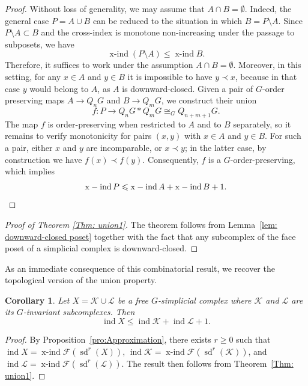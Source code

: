 \documentclass[preprint,12pt]{article}
\renewcommand{\le}{\leqslant}
\renewcommand{\ge}{\geqslant}
\newtheorem{corollary}[theorem]{Corollary}
\theoremstyle{definition}
\theoremstyle{remark}
\numberwithin{equation}{section}
\DeclareMathOperator{\ind}{ind}
\DeclareMathOperator{\xind}{x-ind}
\DeclareMathOperator{\sd}{sd}
\begin{document}
\begin{proof}
Without loss of generality, we may assume that $A\cap B=\emptyset$. Indeed, the general case $P=A\cup B$ can be reduced to the situation in which $B=P\setminus
A$. Since $P\setminus A\subset B$ and the cross-index is monotone non-increasing
under the passage to subposets, we have
\[
\xind(P\setminus A)\le \xind B.
\]
Therefore, it suffices to work under the assumption $A\cap B=\emptyset$. Moreover, in this setting, for any $x\in A$ and $y\in B$ it is impossible to have $y \prec x$, because in that case $y$
would belong to $A$, as $A$ is downward-closed. Given a pair of $G$-order preserving maps $A\to Q_nG$ and $B\to Q_mG$, we construct their union
\[
f:P\to Q_nG*Q_mG\cong_{G} Q_{n+m+1}G.
\]
The map $f$ is order-preserving when restricted to $A$ and to $B$ separately, so it
remains to verify monotonicity for pairs $(x,y)$ with $x\in A$ and $y\in B$. For such a pair, either $x$
and $y$ are incomparable, or $x \prec y$; in the latter case, by construction we have $f(x)\prec f(y)$. Consequently,
$f$ is a $G$-order-preserving, which implies
\[
\xind P\le \xind A+\xind B+1.\qedhere
\]
\end{proof}

\begin{proof}[Proof of Theorem \ref{Thm: union1}]
The theorem follows from Lemma~\ref{lem: downward-closed poset} together with the fact that any subcomplex of the face poset of a simplicial complex is downward-closed.
\end{proof}

As an immediate consequence of this combinatorial result, we recover the topological version of the union property.

\begin{corollary}{\cite{schw1966}}
Let $X = \mathcal{K} \cup \mathcal{L}$ be a free $G$-simplicial complex where $\mathcal{K}$ and $\mathcal{L}$ are its $G$-invariant subcomplexes. Then
\[
\ind X \le \ind \mathcal{K} + \ind \mathcal{L} + 1.
\]
\end{corollary}

\begin{proof}
By Proposition~\ref{pro:Approximation}, there exists $r \ge 0$ such that 
$\ind X = \xind \mathcal{F}(\sd^r(X))$, $\ind \mathcal{K} = \xind \mathcal{F}(\sd^r(\mathcal{K}))$,
and $\ind \mathcal{L} = \xind \mathcal{F}(\sd^r(\mathcal{L}))$.
The result then follows from Theorem~\ref{Thm: union1}.
\end{proof}
\end{document}
